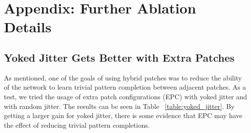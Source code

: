 \documentclass[10pt,twocolumn,letterpaper]{article}
\begin{document}
\section{Appendix: Further Ablation Details} \label{ablation_appendix}

\subsection{Yoked Jitter Gets Better with Extra Patches}

As mentioned, one of the goals of using hybrid patches was to reduce the ability of the network to learn trivial pattern completion between adjacent patches. As a test, we tried the usage of extra patch configurations (EPC) with yoked jitter and with random jitter. The results can be seen in Table  ~\ref{table:yoked_jitter}.  By getting a larger gain for yoked jitter, there is some evidence that EPC may have the effect of reducing trivial pattern completions.

\end{document}
